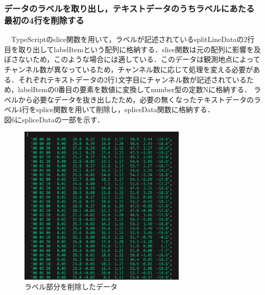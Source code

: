  \subsubsection{データのラベルを取り出し，テキストデータのうちラベルにあたる最初の4行を削除する}
　TypeScriptのslice関数を用いて，ラベルが記述されているsplitLineDataの2行目を取り出してlabelItemという配列に格納する．slice関数は元の配列に影響を及ぼさないため，このような場合には適している．\cite{mdn_slice}このデータは観測地点によってチャンネル数が異なっているため，チャンネル数に応じて処理を変える必要がある．それぞれテキストデータの2行1文字目にチャンネル数が記述されているため，labelItemの0番目の要素を数値に変換してnumber型の定数Nに格納する．
 ラベルから必要なデータを抜き出したため，必要の無くなったテキストデータのラベル4行をsplice関数を用いて削除し，spliceData関数に格納する．\\
 図6にspliceDataの一部を示す．\\
 \begin{figure}[h]
   \centering
   \includegraphics[width=80mm]{fig/spliceData.png}
   \caption{ラベル部分を削除したデータ}
 \end{figure}
 
